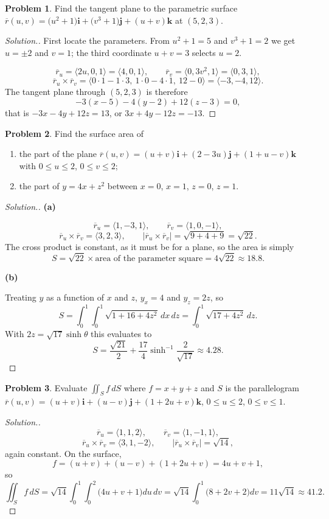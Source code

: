 \documentclass[11pt,a4paper]{article}
\theoremstyle{definition}
\newtheorem{problemx}{Problem}[subsection]
\newenvironment{problem}{\begin{problemx}}{\end{problemx}}
\newenvironment{solution}
  {\renewcommand{\qedsymbol}{}\begin{proof}[\textit{Solution}.]}
  {\end{proof}}
\newcommand{\subhead}[1]{%
  \par\medskip\noindent\textbf{#1}\par\nobreak\smallskip}
\begin{document}
\begin{problem}
Find the tangent plane to the parametric surface
$\overline{r}(u,v) = \big(u^2+1\big)\textbf{i} + \big(v^3+1\big)\textbf{j}
+ (u+v)\textbf{k}$ at $(5,2,3)$.
\end{problem}
\begin{solution}
First locate the parameters. From $u^2+1 = 5$ and $v^3+1 = 2$ we get
$u = \pm 2$ and $v = 1$; the third coordinate $u+v = 3$ selects $u = 2$.

$$\overline{r}_u = \langle 2u, 0, 1\rangle = \langle 4,0,1\rangle,\qquad
\overline{r}_v = \big\langle 0, 3v^2, 1\big\rangle = \langle 0,3,1\rangle ,$$
$$\overline{r}_u\times\overline{r}_v
= \langle 0\cdot 1 - 1\cdot 3,\ 1\cdot 0 - 4\cdot 1,\ 12-0\rangle
= \langle -3, -4, 12\rangle .$$
The tangent plane through $(5,2,3)$ is therefore
$$-3(x-5) - 4(y-2) + 12(z-3) = 0 ,$$
that is $-3x-4y+12z = 13$, or $3x+4y-12z = -13$.
\end{solution}

\begin{problem}
Find the surface area of
\begin{enumerate}
\item[(a)] the part of the plane
$\overline{r}(u,v) = (u+v)\textbf{i} + (2-3u)\textbf{j} + (1+u-v)\textbf{k}$
with $0\leq u\leq 2$, $0\leq v\leq 2$;
\item[(b)] the part of $y = 4x+z^2$ between $x=0$, $x=1$, $z=0$, $z=1$.
\end{enumerate}
\end{problem}
\begin{solution}
\subhead{(a)}
$$\overline{r}_u = \langle 1,-3,1\rangle,\qquad
\overline{r}_v = \langle 1,0,-1\rangle ,$$
$$\overline{r}_u\times\overline{r}_v = \langle 3,2,3\rangle,\qquad
\left|\overline{r}_u\times\overline{r}_v\right| = \sqrt{9+4+9} = \sqrt{22}.$$
The cross product is constant, as it must be for a plane, so the area is simply
$$S = \sqrt{22}\times\text{area of the parameter square}
= 4\sqrt{22}\approx 18.8 .$$

\subhead{(b)}
Treating $y$ as a function of $x$ and $z$, $y_x = 4$ and $y_z = 2z$, so
$$S = \int_0^1\int_0^1\sqrt{1+16+4z^2}\,dx\,dz
= \int_0^1\sqrt{17+4z^2}\,dz .$$
With $2z = \sqrt{17}\sinh\theta$ this evaluates to
$$S = \frac{\sqrt{21}}{2} + \frac{17}{4}\sinh^{-1}\frac{2}{\sqrt{17}}
\approx 4.28 .$$
\end{solution}

\begin{problem}
Evaluate $\displaystyle{\iint_S f\,dS}$ where $f = x+y+z$ and $S$ is the
parallelogram $\overline{r}(u,v) = (u+v)\textbf{i} + (u-v)\textbf{j}
+ (1+2u+v)\textbf{k}$, $0\leq u\leq 2$, $0\leq v\leq 1$.
\end{problem}
\begin{solution}
$$\overline{r}_u = \langle 1,1,2\rangle,\qquad
\overline{r}_v = \langle 1,-1,1\rangle ,$$
$$\overline{r}_u\times\overline{r}_v = \langle 3,1,-2\rangle,\qquad
\left|\overline{r}_u\times\overline{r}_v\right| = \sqrt{14},$$
again constant. On the surface,
$$f = (u+v)+(u-v)+(1+2u+v) = 4u+v+1 ,$$
so
$$\iint_S f\,dS = \sqrt{14}\int_0^1\int_0^2\big(4u+v+1\big)du\,dv
= \sqrt{14}\int_0^1\big(8+2v+2\big)dv = 11\sqrt{14}\approx 41.2 .$$
\end{solution}
\end{document}
